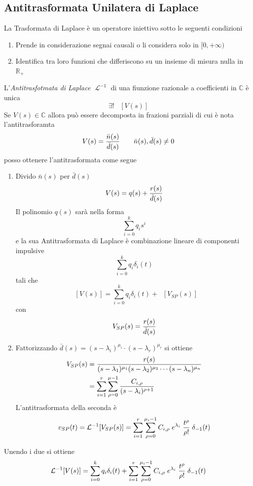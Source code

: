 \documentclass{article}
\newcommand{\Laplace}{\mathop{\mathcal{L}}}
\newcommand{\AntiLaplace}{\mathop{\mathcal{L}^{-1}}}
\begin{document}
		\subsection{Antitrasformata Unilatera di Laplace}
			La Trasformata di Laplace è un operatore iniettivo sotto le seguenti condizioni
			\begin{enumerate}
				\item Prende in considerazione segnai causali o li considera solo in $ [0, +\infty) $
				\item Identifica tra loro funzioni che differiscono su un insieme di misura nulla in $ \mathbb{R}_+ $
			\end{enumerate}
			L'\textit{Antitrasfotmata di Laplace} $ \Laplace^{-1} $ di una fiunzione razionale a coefficienti in $ \mathbb{C} $ è unica
			\[
				\exists!\; \AntiLaplace[V(s)]
			\]
			Se $ V(s) \in \mathbb{C} $ allora può essere decomposta in frazioni parziali di cui è nota l'antitrasforamta
			\[
				V(s) = {{\bar{n}(s)}\over{\bar{d}(s)}}\quad\quad \bar{n}(s), \bar{d}(s) \neq 0
			\]
			posso ottenere l'antitrasformata come segue
			\begin{enumerate}
				\item Divido $ \bar{n}(s) $ per $ \bar{d}(s) $
					  \[
					  	V(s) = q(s) + {{r(s)}\over{\bar{d}(s)}}
					  \]
					  Il polinomio $ q(s) $ sarà nella forma
					  \[
					  	\sum_{i=0}^{k} {q_i s^i}
					  \]
					  e la sua Antitrasformata di Laplace è combinazione lineare di componenti impulsive
					  \[
					  	\sum_{i=0}^{k} {q_i \delta_i(t)}
					  \]
					  tali che
					  \[
					  	\AntiLaplace[V(s)] = \sum_{i=0}^{k} {q_i \delta_i(t)} + \AntiLaplace[V_{SP}(s)]
					  \]
					  con
					  \[
					  	V_{SP}(s) = {{r(s)}\over{\bar{d}(s)}}
					  \]
				\item Fattorizzando $ \bar{d}(s) = (s-\lambda_i)^{\mu_i} \cdot (s-\lambda_r)^{\mu_r} $ si ottiene
				\[
					\begin{aligned}
						V_{SP}(s) &= {{r(s)}\over{(s-\lambda_1)^{\mu_1}(s-\lambda_2)^{\mu_2} \cdots (s-\lambda_n)^{\mu_n}}} \\
						&= \sum_{i=1}^{r} {\sum_{\rho=0}^{\mu - 1} {{C_{i,\rho}}\over{(s-\lambda_i)^{\rho + 1}}}}
					\end{aligned}
				\]
				L'antitrasformata della seconda è
				\[
					v_{SP}(t) = \AntiLaplace[V_{SP}(s)] = \sum_{i=1}^{r} {\sum_{\rho=0}^{\mu_i - 1} {C_{i,\rho}\; e^{\lambda_i}\; {{t^{\rho}}\over{\rho!}}\; \delta_{-1}(t)}}
				\]
			\end{enumerate}
			Unendo i due si ottiene
			\[
				\AntiLaplace[V(s)] = \sum_{i=0}^{k} {q_i \delta_i(t)} + \sum_{i=1}^{r} {\sum_{\rho=0}^{\mu_i - 1} {C_{i,\rho}\; e^{\lambda_i}\; {{t^{\rho}}\over{\rho!}}\; \delta_{-1}(t)}}
			\]
\end{document}
